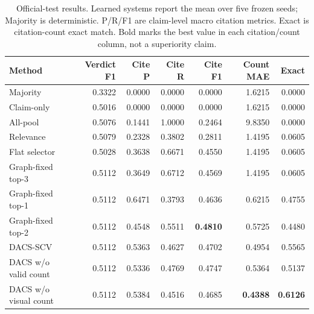 \begin{table}[t]
\centering
\caption{Official-test results. Learned systems report the mean over five frozen seeds; Majority is deterministic. P/R/F1 are claim-level macro citation metrics. Exact is citation-count exact match. Bold marks the best value in each citation/count column, not a superiority claim.}
\label{tab:main-results}
\small
\setlength{\tabcolsep}{5pt}
\begin{tabular}{@{}lrrrrrr@{}}
\toprule
Method & Verdict F1 & Cite P & Cite R & Cite F1 & Count MAE & Exact \\
\midrule
Majority & 0.3322 & 0.0000 & 0.0000 & 0.0000 & 1.6215 & 0.0000 \\
Claim-only & 0.5016 & 0.0000 & 0.0000 & 0.0000 & 1.6215 & 0.0000 \\
All-pool & 0.5076 & 0.1441 & 1.0000 & 0.2464 & 9.8350 & 0.0000 \\
Relevance & 0.5079 & 0.2328 & 0.3802 & 0.2811 & 1.4195 & 0.0605 \\
Flat selector & 0.5028 & 0.3638 & 0.6671 & 0.4550 & 1.4195 & 0.0605 \\
\midrule
Graph-fixed top-3 & 0.5112 & 0.3649 & 0.6712 & 0.4569 & 1.4195 & 0.0605 \\
Graph-fixed top-1 & 0.5112 & 0.6471 & 0.3793 & 0.4636 & 0.6215 & 0.4755 \\
Graph-fixed top-2 & 0.5112 & 0.4548 & 0.5511 & \textbf{0.4810} & 0.5725 & 0.4480 \\
\midrule
DACS-SCV & 0.5112 & 0.5363 & 0.4627 & 0.4702 & 0.4954 & 0.5565 \\
DACS w/o valid count & 0.5112 & 0.5336 & 0.4769 & 0.4747 & 0.5364 & 0.5137 \\
DACS w/o visual count & 0.5112 & 0.5384 & 0.4516 & 0.4685 & \textbf{0.4388} & \textbf{0.6126} \\
\bottomrule
\end{tabular}
\end{table}
